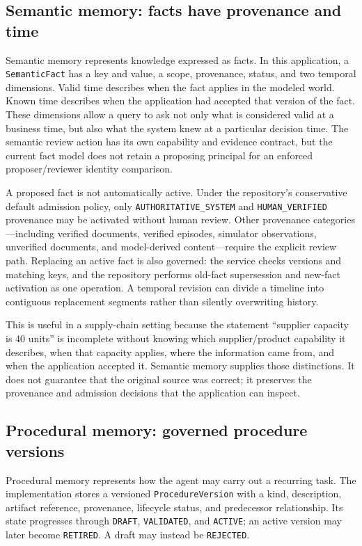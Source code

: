 \subsection{Semantic memory: facts have provenance and time}
\label{subsec:ch20-semantic-memory}

Semantic memory represents knowledge expressed as facts. In this application, a \texttt{SemanticFact} has a key and value, a scope, provenance, status, and two temporal dimensions. Valid time describes when the fact applies in the modeled world. Known time describes when the application had accepted that version of the fact. These dimensions allow a query to ask not only what is considered valid at a business time, but also what the system knew at a particular decision time. The semantic review action has its own capability and evidence contract, but the current fact model does not retain a proposing principal for an enforced proposer/reviewer identity comparison.

A proposed fact is not automatically active. Under the repository's conservative default admission policy, only \texttt{AUTHORITATIVE\_SYSTEM} and \texttt{HUMAN\_VERIFIED} provenance may be activated without human review. Other provenance categories—including verified documents, verified episodes, simulator observations, unverified documents, and model-derived content—require the explicit review path. Replacing an active fact is also governed: the service checks versions and matching keys, and the repository performs old-fact supersession and new-fact activation as one operation. A temporal revision can divide a timeline into contiguous replacement segments rather than silently overwriting history.

This is useful in a supply-chain setting because the statement “supplier capacity is 40 units” is incomplete without knowing which supplier/product capability it describes, when that capacity applies, where the information came from, and when the application accepted it. Semantic memory supplies those distinctions. It does not guarantee that the original source was correct; it preserves the provenance and admission decisions that the application can inspect.

\subsection{Procedural memory: governed procedure versions}
\label{subsec:ch20-procedural-memory}

Procedural memory represents how the agent may carry out a recurring task. The implementation stores a versioned \texttt{ProcedureVersion} with a kind, description, artifact reference, provenance, lifecycle status, and predecessor relationship. Its state progresses through \texttt{DRAFT}, \texttt{VALIDATED}, and \texttt{ACTIVE}; an active version may later become \texttt{RETIRED}. A draft may instead be \texttt{REJECTED}.

